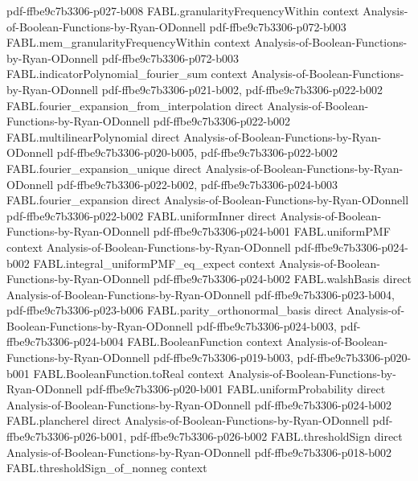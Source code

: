 \begin{theorem}
  {pdf-ffbe9c7b3306-p027-b008}
\proofstep
  {FABL.granularityFrequencyWithin}
  {context}
  {Analysis-of-Boolean-Functions-by-Ryan-ODonnell}
  {pdf-ffbe9c7b3306-p072-b003}
\proofstep
  {FABL.mem_granularityFrequencyWithin}
  {context}
  {Analysis-of-Boolean-Functions-by-Ryan-ODonnell}
  {pdf-ffbe9c7b3306-p072-b003}
\proofstep
  {FABL.indicatorPolynomial_fourier_sum}
  {context}
  {Analysis-of-Boolean-Functions-by-Ryan-ODonnell}
  {pdf-ffbe9c7b3306-p021-b002,
    pdf-ffbe9c7b3306-p022-b002}
\proofstep
  {FABL.fourier_expansion_from_interpolation}
  {direct}
  {Analysis-of-Boolean-Functions-by-Ryan-ODonnell}
  {pdf-ffbe9c7b3306-p022-b002}
\proofstep
  {FABL.multilinearPolynomial}
  {direct}
  {Analysis-of-Boolean-Functions-by-Ryan-ODonnell}
  {pdf-ffbe9c7b3306-p020-b005,
    pdf-ffbe9c7b3306-p022-b002}
\proofstep
  {FABL.fourier_expansion_unique}
  {direct}
  {Analysis-of-Boolean-Functions-by-Ryan-ODonnell}
  {pdf-ffbe9c7b3306-p022-b002,
    pdf-ffbe9c7b3306-p024-b003}
\proofstep
  {FABL.fourier_expansion}
  {direct}
  {Analysis-of-Boolean-Functions-by-Ryan-ODonnell}
  {pdf-ffbe9c7b3306-p022-b002}
\proofstep
  {FABL.uniformInner}
  {direct}
  {Analysis-of-Boolean-Functions-by-Ryan-ODonnell}
  {pdf-ffbe9c7b3306-p024-b001}
\proofstep
  {FABL.uniformPMF}
  {context}
  {Analysis-of-Boolean-Functions-by-Ryan-ODonnell}
  {pdf-ffbe9c7b3306-p024-b002}
\proofstep
  {FABL.integral_uniformPMF_eq_expect}
  {context}
  {Analysis-of-Boolean-Functions-by-Ryan-ODonnell}
  {pdf-ffbe9c7b3306-p024-b002}
\proofstep
  {FABL.walshBasis}
  {direct}
  {Analysis-of-Boolean-Functions-by-Ryan-ODonnell}
  {pdf-ffbe9c7b3306-p023-b004,
    pdf-ffbe9c7b3306-p023-b006}
\proofstep
  {FABL.parity_orthonormal_basis}
  {direct}
  {Analysis-of-Boolean-Functions-by-Ryan-ODonnell}
  {pdf-ffbe9c7b3306-p024-b003,
    pdf-ffbe9c7b3306-p024-b004}
\proofstep
  {FABL.BooleanFunction}
  {context}
  {Analysis-of-Boolean-Functions-by-Ryan-ODonnell}
  {pdf-ffbe9c7b3306-p019-b003,
    pdf-ffbe9c7b3306-p020-b001}
\proofstep
  {FABL.BooleanFunction.toReal}
  {context}
  {Analysis-of-Boolean-Functions-by-Ryan-ODonnell}
  {pdf-ffbe9c7b3306-p020-b001}
\proofstep
  {FABL.uniformProbability}
  {direct}
  {Analysis-of-Boolean-Functions-by-Ryan-ODonnell}
  {pdf-ffbe9c7b3306-p024-b002}
\proofstep
  {FABL.plancherel}
  {direct}
  {Analysis-of-Boolean-Functions-by-Ryan-ODonnell}
  {pdf-ffbe9c7b3306-p026-b001,
    pdf-ffbe9c7b3306-p026-b002}
\proofstep
  {FABL.thresholdSign}
  {direct}
  {Analysis-of-Boolean-Functions-by-Ryan-ODonnell}
  {pdf-ffbe9c7b3306-p018-b002}
\proofstep
  {FABL.thresholdSign_of_nonneg}
  {context}

\end{theorem}
